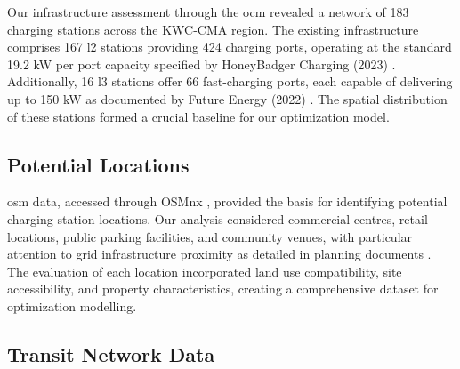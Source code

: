 Our infrastructure assessment through the \gls{ocm} \cite{ocm_2024} revealed a network of 183 charging stations across the KWC-CMA region. The existing infrastructure comprises 167 \gls{l2} stations providing 424 charging ports, operating at the standard 19.2 kW per port capacity specified by HoneyBadger Charging (2023) \cite{nrc_electric_2024}. Additionally, 16 \gls{l3} stations offer 66 fast-charging ports, each capable of delivering up to 150 kW as documented by Future Energy (2022) \cite{dinello_what_2022}. The spatial distribution of these stations formed a crucial baseline for our optimization model.

\subsection{Potential Locations}


\Gls{osm} data, accessed through OSMnx \cite{boeing_modeling_2024}, provided the basis for identifying potential charging station locations. Our analysis considered commercial centres, retail locations, public parking facilities, and community venues, with particular attention to grid infrastructure proximity as detailed in  planning documents \cite{ieso_kwc_2021}. The evaluation of each location incorporated land use compatibility, site accessibility, and property characteristics, creating a comprehensive dataset for optimization modelling.

\subsection{Transit Network Data}


